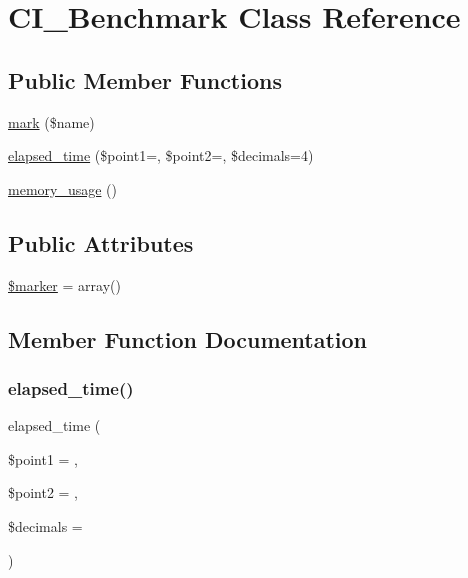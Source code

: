 \hypertarget{class_c_i___benchmark}{}\section{C\+I\+\_\+\+Benchmark Class Reference}
\label{class_c_i___benchmark}
\subsection*{Public Member Functions}
\begin{DoxyCompactItemize}
\item 
\mbox{\hyperlink{class_c_i___benchmark_a18c82f5dd0118d3e7c57bcd86dc32e9e}{mark}} (\$name)
\item 
\mbox{\hyperlink{class_c_i___benchmark_acfe5ce040b92f677e01b5dcc9cdcc3bf}{elapsed\+\_\+time}} (\$point1=\textquotesingle{}\textquotesingle{}, \$point2=\textquotesingle{}\textquotesingle{}, \$decimals=4)
\item 
\mbox{\hyperlink{class_c_i___benchmark_abdb10dca75c4c15f94796af1602d5b80}{memory\+\_\+usage}} ()
\end{DoxyCompactItemize}
\subsection*{Public Attributes}
\begin{DoxyCompactItemize}
\item 
\mbox{\hyperlink{class_c_i___benchmark_aad34fbf53cda6bd8a3a9c46764d534fa}{\$marker}} = array()
\end{DoxyCompactItemize}


\subsection{Member Function Documentation}
\mbox{\label{class_c_i___benchmark_acfe5ce040b92f677e01b5dcc9cdcc3bf}} 
\subsubsection{\texorpdfstring{elapsed\+\_\+time()}{elapsed\_time()}}
{\footnotesize\ttfamily elapsed\+\_\+time (\begin{DoxyParamCaption}\item[{}]{\$point1 = {\ttfamily \textquotesingle{}\textquotesingle{}},  }\item[{}]{\$point2 = {\ttfamily \textquotesingle{}\textquotesingle{}},  }\item[{}]{\$decimals = {} }\end{DoxyParamCaption})}

